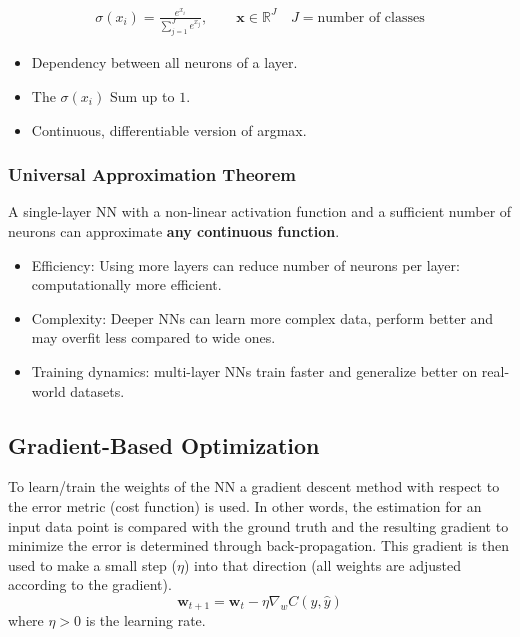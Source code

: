 \begin{gather*}
    \sigma(x_i) = \frac{e^{x_i}}{\sum_{j=1}^{J}e^{x_j}}, \qquad \mathbf{x} \in \mathbb{R}^J \quad J=\text{number of classes}
\end{gather*}
\begin{itemize}
    \item Dependency between all neurons of a layer.
    \item The $\sigma(x_i)$ Sum up to $1$.
    \item Continuous, differentiable version of argmax.
\end{itemize}



\subsubsection{Universal Approximation Theorem}
A single-layer NN with a non-linear activation function and a sufficient number of neurons can approximate \textbf{any continuous function}.
\newpar{}
\begin{itemize}
    \item Efficiency: Using more layers can reduce number of neurons per layer: computationally more efficient.
    \item Complexity: Deeper NNs can learn more complex data, perform better and may overfit less compared to wide ones.
    \item Training dynamics: multi-layer NNs train faster and generalize better on real-world datasets.
\end{itemize}

\renewcommand{\arraystretch}{1}
\setlength\tabcolsep{\oldtabcolsep}

\subsection{Gradient-Based Optimization}

To learn/train the weights of the NN a gradient descent method with respect to the error metric (cost function) is used. In other words, the estimation for an input data point is compared with the ground truth and the resulting gradient to minimize the error is determined through back-propagation. This gradient is then used to make a small step ($\eta$) into that direction (all weights are adjusted according to the gradient).
\begin{equation*}
    \mathbf{w}_{t+1} = \mathbf{w}_t - \eta \nabla_w C(y,\hat{y})
\end{equation*}
where $\eta > 0$ is the learning rate.

